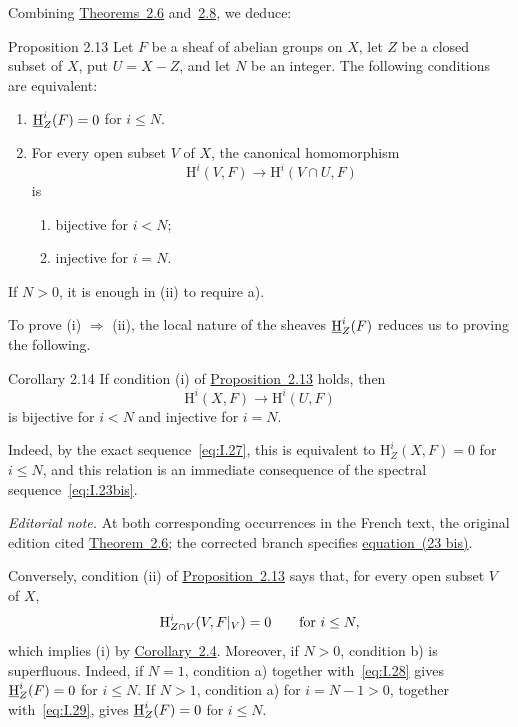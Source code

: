 Combining \hyperref[I.2.6]{Theorems~2.6} and~\hyperref[I.2.8]{2.8}, we deduce:

\begin{sgastatement}{Proposition 2.13}
Let $F$ be a sheaf of abelian groups on $X$, let $Z$ be a closed subset of
$X$, put $U=X-Z$, and let $N$ be an integer. The following conditions are
equivalent:
\begin{enumerate}[label=\textup{(\roman*)},leftmargin=2.7em]
  \item $\mathop{\underline{\mathrm H}}\nolimits_Z^i(F)=0$ for $i\le N$.
  \item For every open subset $V$ of $X$, the canonical homomorphism
  \[
    \mathrm H^i(V,F)\longrightarrow\mathrm H^i(V\cap U,F)
  \]
  is
  \begin{enumerate}[label=\textup{\alph*)},leftmargin=2.5em]
    \item bijective for $i<N$;
    \item injective for $i=N$.
  \end{enumerate}
\end{enumerate}
If $N>0$, it is enough in \textup{(ii)} to require \textup{a)}.
\end{sgastatement}

To prove \textup{(i)} $\Rightarrow$ \textup{(ii)}, the local nature of the
sheaves $\mathop{\underline{\mathrm H}}\nolimits_Z^i(F)$ reduces us to proving the following.

\begin{sgastatement}{Corollary 2.14}
If condition \textup{(i)} of \hyperref[I.2.13]{Proposition~2.13} holds, then
\[
  \mathrm H^i(X,F)\longrightarrow\mathrm H^i(U,F)
\]
is bijective for $i<N$ and injective for $i=N$.
\end{sgastatement}

Indeed, by the exact sequence~\eqref{eq:I.27}, this is equivalent to
$\mathrm H_Z^i(X,F)=0$ for $i\le N$, and this relation is an
immediate consequence of the spectral sequence~\eqref{eq:I.23bis}.

\noindent\textit{Editorial note.} At both corresponding occurrences in the
French text, the original edition cited \hyperref[I.2.6]{Theorem~2.6}; the corrected branch
specifies \hyperref[eq:I.23bis]{equation~(23 bis)}.

Conversely, condition \textup{(ii)} of \hyperref[I.2.13]{Proposition~2.13} says that, for every
open subset $V$ of $X$,
\[
  \mathrm H_{Z\cap V}^i(V,F\vert_{V})=0
  \qquad\text{for }i\le N,
\]
which implies \textup{(i)} by \hyperref[I.2.4]{Corollary~2.4}. Moreover, if $N>0$, condition
\textup{b)} is superfluous. Indeed, if $N=1$, condition \textup{a)} together
with~\eqref{eq:I.28} gives $\mathop{\underline{\mathrm H}}\nolimits_Z^i(F)=0$ for $i\le N$. If $N>1$,
condition \textup{a)} for $i=N-1>0$, together with~\eqref{eq:I.29}, gives
$\mathop{\underline{\mathrm H}}\nolimits_Z^i(F)=0$ for $i\le N$.

